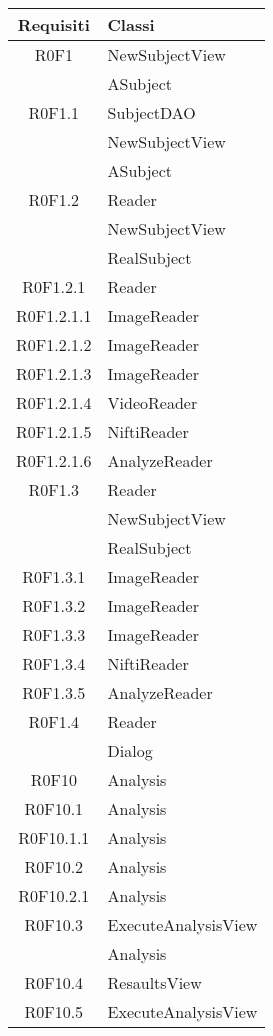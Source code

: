 \begin{center}
\begin{longtable}{|c|l|}
\hline

\textbf{Requisiti} & \textbf{Classi} \\


\hline
R0F1 & NewSubjectView \\ 
 & ASubject \\ 
\hline
R0F1.1 & SubjectDAO \\ 
 & NewSubjectView \\ 
 & ASubject \\ 
\hline
R0F1.2 & Reader \\ 
 & NewSubjectView \\ 
 & RealSubject \\ 
\hline
R0F1.2.1 & Reader \\ 
\hline
R0F1.2.1.1 & ImageReader \\ 
\hline
R0F1.2.1.2 & ImageReader \\ 
\hline
R0F1.2.1.3 & ImageReader \\ 
\hline
R0F1.2.1.4 & VideoReader \\ 
\hline
R0F1.2.1.5 & NiftiReader \\ 
\hline
R0F1.2.1.6 & AnalyzeReader \\ 
\hline
R0F1.3 & Reader \\ 
 & NewSubjectView \\ 
 & RealSubject \\ 
\hline
R0F1.3.1 & ImageReader \\ 
\hline
R0F1.3.2 & ImageReader \\ 
\hline
R0F1.3.3 & ImageReader \\ 
\hline
R0F1.3.4 & NiftiReader \\ 
\hline
R0F1.3.5 & AnalyzeReader \\ 
\hline
R0F1.4 & Reader \\ 
 & Dialog \\ 
\hline
R0F10 & Analysis \\ 
\hline
R0F10.1 & Analysis \\ 
\hline
R0F10.1.1 & Analysis \\ 
\hline
R0F10.2 & Analysis \\ 
\hline
R0F10.2.1 & Analysis \\ 
\hline
R0F10.3 & ExecuteAnalysisView \\ 
 & Analysis \\ 
\hline
R0F10.4 & ResaultsView \\ 
\hline
R0F10.5 & ExecuteAnalysisView \\ 

\end{longtable}
\end{center}
